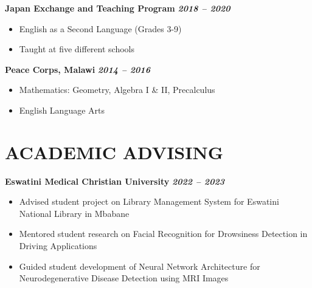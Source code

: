\documentclass[11pt,letterpaper]{article}
\begin{document}
\textbf{Japan Exchange and Teaching Program} \hfill \textbf{\textit{2018 -- 2020}}
\begin{itemize}
    \item English as a Second Language (Grades 3-9)
    \item Taught at five different schools
\end{itemize}

\textbf{Peace Corps, Malawi} \hfill \textbf{\textit{2014 -- 2016}}
\begin{itemize}
    \item Mathematics: Geometry, Algebra I \& II, Precalculus
    \item English Language Arts
\end{itemize}

\section{ACADEMIC ADVISING}

\textbf{Eswatini Medical Christian University} \hfill \textbf{\textit{2022 -- 2023}}
\begin{itemize}
    \item Advised student project on Library Management System for Eswatini National Library in Mbabane
    \item Mentored student research on Facial Recognition for Drowsiness Detection in Driving Applications
    \item Guided student development of Neural Network Architecture for Neurodegenerative Disease Detection using MRI Images
\end{itemize}

\end{document}
